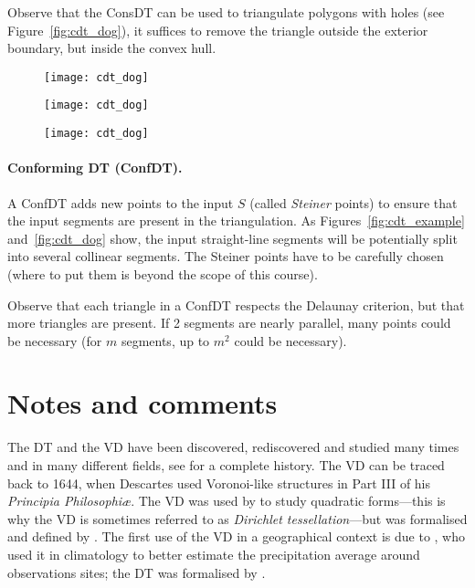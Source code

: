 %

Observe that the ConsDT can be used to triangulate polygons with holes (see Figure~\ref{fig:cdt_dog}), it suffices to remove the triangle outside the exterior boundary, but inside the convex hull.

\begin{figure*}[b]
  \centering
  \begin{subfigure}[b]{0.3\linewidth}
    \centering
    \texttt{[image: cdt\_dog]}
    \caption{}
  \end{subfigure}%
  \qquad %
  \begin{subfigure}[b]{0.3\linewidth}
    \centering
    \texttt{[image: cdt\_dog]}
    \caption{}
  \end{subfigure}%
  \qquad %
  \begin{subfigure}[b]{0.3\linewidth}
    \centering
    \texttt{[image: cdt\_dog]}
    \caption{}
  \end{subfigure}%
  \caption{\textbf{(a)} One polygon with 4 holes (interior rings). \textbf{(b)} its ConsDT\@. \textbf{(c)} its ConfDT (the Steiner point added is in red).}%
\label{fig:cdt_dog}
\end{figure*}


%
\paragraph*{Conforming DT (ConfDT).}
A ConfDT adds new points to the input $S$ (called \emph{Steiner} points) to ensure that the input segments are present in the triangulation.%
As Figures~\ref{fig:cdt_example} and~\ref{fig:cdt_dog} show, the input straight-line segments will be potentially split into several collinear segments. 
The Steiner points have to be carefully chosen (where to put them is beyond the scope of this course).

Observe that each triangle in a ConfDT respects the Delaunay criterion, but that more triangles are present. 
If 2 segments are nearly parallel, many points could be necessary (for $m$ segments, up to $m^2$ could be necessary).


%
\section{Notes and comments}%
\label{sec:notes}

The DT and the VD have been discovered, rediscovered and studied many times and in many different fields, see \citet{Okabe00} for a complete history.
The VD can be traced back to 1644, when Descartes used Voronoi-like structures in Part III of his \emph{Principia Philosophi\ae}. 
The VD was used by \citet{Dirichlet50} to study quadratic forms---this is why the VD is sometimes referred to as \emph{Dirichlet tessellation}---but was formalised and defined by \citet{Voronoi08}. 
The first use of the VD in a geographical context is due to \citet{Thiessen11}, who used it in climatology to better estimate the precipitation average around observations sites; the DT was formalised by \citet{Delaunay34}. 

